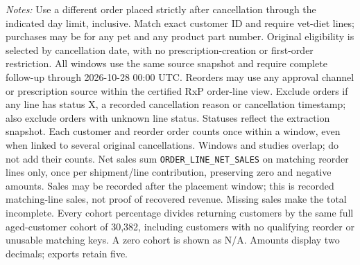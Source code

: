 \begin{table}[!htbp]
\begin{minipage}{\linewidth}
\footnotesize
\textit{Notes:} Use a different order placed strictly after cancellation through the indicated day limit, inclusive. Match exact customer ID and require vet-diet lines; purchases may be for any pet and any product part number. Original eligibility is selected by
cancellation date, with no prescription-creation or first-order restriction.
All windows use the same source snapshot and require complete follow-up through
2026-10-28 00:00 UTC. Reorders may use any approval channel or prescription
source within the certified RxP order-line view. Exclude orders if any line has
status X, a recorded cancellation reason or cancellation timestamp; also exclude
orders with unknown line status. Statuses reflect the extraction snapshot.
Each customer and reorder order counts once within a window, even when linked
to several original cancellations. Windows and studies overlap; do not add their counts.
Net sales sum \texttt{ORDER\_LINE\_NET\_SALES} on matching reorder lines only,
once per shipment/line contribution, preserving zero and negative amounts.
Sales may be recorded after the placement window; this is recorded matching-line
sales, not proof of recovered revenue. Missing sales make the total incomplete.
Every cohort percentage divides returning customers by the same full aged-customer cohort of 30,382, including customers with no qualifying reorder or unusable matching keys. A zero cohort is shown as N/A. Amounts display two decimals; exports retain five.
\end{minipage}
\end{table}
